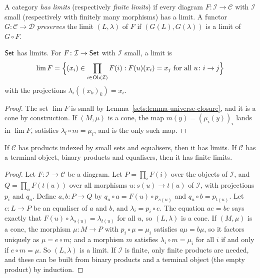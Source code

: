 \begin{definition}\label{categories:definition-has-limits}
A category \emph{has limits} (respectively \emph{finite limits}) if every
diagram $F \colon \mathcal{I} \to \mathcal{C}$ with $\mathcal{I}$ small (respectively
with finitely many morphisms) has a limit. A functor $G \colon \mathcal{C} \to \mathcal{D}$
\emph{preserves} the limit $(L, \lambda)$ of $F$ if $(G(L), G(\lambda))$ is a limit
of $G \circ F$.
\end{definition}

\begin{proposition}\label{categories:proposition-limits-sets}
$\mathsf{Set}$ has limits. For $F \colon \mathcal{I} \to \mathsf{Set}$ with $\mathcal{I}$ small, a limit
is
\[
\lim F = \Bigl\{(x_i) \in \prod_{i \in \operatorname{Ob}(\mathcal{I})} F(i) : F(u)(x_i) = x_j \text{ for all } u \colon i \to j\Bigr\}
\]
with the projections $\lambda_i((x_k)_k) = x_i$.
\end{proposition}

\begin{proof}
The set $\lim F$ is small by Lemma~\ref{sets:lemma-universe-closure}, and it
is a cone by construction. If $(M, \mu)$ is a cone, the map
$m(y) = (\mu_i(y))_i$ lands in $\lim F$, satisfies $\lambda_i \circ m = \mu_i$, and is
the only such map.
\end{proof}

\begin{theorem}\label{categories:theorem-limits-products-equalisers}
If $\mathcal{C}$ has products indexed by small sets and equalisers, then it has
limits. If $\mathcal{C}$ has a terminal object, binary products and equalisers,
then it has finite limits.
\end{theorem}

\begin{proof}
Let $F \colon \mathcal{I} \to \mathcal{C}$ be a diagram. Let $P = \prod_{i} F(i)$ over the
objects of $\mathcal{I}$, and $Q = \prod_{u} F(t(u))$ over all morphisms
$u \colon s(u) \to t(u)$ of $\mathcal{I}$, with projections $p_i$ and $q_u$. Define
$a, b \colon P \to Q$ by $q_u \circ a = F(u) \circ p_{s(u)}$ and
$q_u \circ b = p_{t(u)}$. Let $e \colon L \to P$ be an equaliser of $a$ and $b$, and
$\lambda_i = p_i \circ e$. The equation $ae = be$ says exactly that
$F(u) \circ \lambda_{s(u)} = \lambda_{t(u)}$ for all $u$, so $(L, \lambda)$ is a cone.
If $(M, \mu)$ is a cone, the morphism $\mu \colon M \to P$ with $p_i \circ \mu = \mu_i$
satisfies $a\mu = b\mu$, so it factors uniquely as $\mu = e \circ m$; and a morphism
$m$ satisfies $\lambda_i \circ m = \mu_i$ for all $i$ if and only if $e \circ m = \mu$.
So $(L, \lambda)$ is a limit. If $\mathcal{I}$ is finite, only finite products are
needed, and these can be built from binary products and a terminal object (the
empty product) by induction.
\end{proof}

